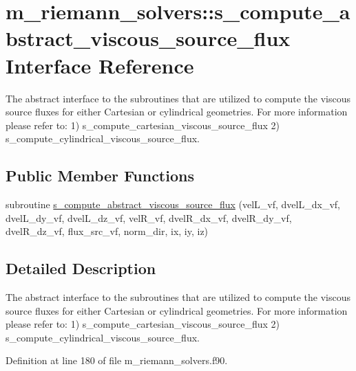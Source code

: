 \hypertarget{interfacem__riemann__solvers_1_1s__compute__abstract__viscous__source__flux}{}\section{m\+\_\+riemann\+\_\+solvers\+:\+:s\+\_\+compute\+\_\+abstract\+\_\+viscous\+\_\+source\+\_\+flux Interface Reference}
\label{interfacem__riemann__solvers_1_1s__compute__abstract__viscous__source__flux}


The abstract interface to the subroutines that are utilized to compute the viscous source fluxes for either Cartesian or cylindrical geometries. For more information please refer to\+: 1) s\+\_\+compute\+\_\+cartesian\+\_\+viscous\+\_\+source\+\_\+flux 2) s\+\_\+compute\+\_\+cylindrical\+\_\+viscous\+\_\+source\+\_\+flux.  


\subsection*{Public Member Functions}
\begin{DoxyCompactItemize}
\item 
subroutine \hyperlink{interfacem__riemann__solvers_1_1s__compute__abstract__viscous__source__flux_a056a0327dbad6c155aafe133092c0a7b}{s\+\_\+compute\+\_\+abstract\+\_\+viscous\+\_\+source\+\_\+flux} (vel\+L\+\_\+vf, dvel\+L\+\_\+dx\+\_\+vf, dvel\+L\+\_\+dy\+\_\+vf, dvel\+L\+\_\+dz\+\_\+vf, vel\+R\+\_\+vf, dvel\+R\+\_\+dx\+\_\+vf, dvel\+R\+\_\+dy\+\_\+vf, dvel\+R\+\_\+dz\+\_\+vf, flux\+\_\+src\+\_\+vf, norm\+\_\+dir, ix, iy, iz)
\end{DoxyCompactItemize}


\subsection{Detailed Description}
The abstract interface to the subroutines that are utilized to compute the viscous source fluxes for either Cartesian or cylindrical geometries. For more information please refer to\+: 1) s\+\_\+compute\+\_\+cartesian\+\_\+viscous\+\_\+source\+\_\+flux 2) s\+\_\+compute\+\_\+cylindrical\+\_\+viscous\+\_\+source\+\_\+flux. 

Definition at line 180 of file m\+\_\+riemann\+\_\+solvers.\+f90.



